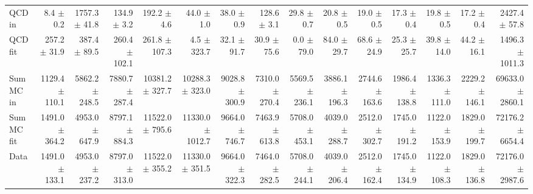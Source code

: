 \begin{table}[htbp]
{\begin{tabular}{lrrrrrrrrrrrrrr}
\hline
QCD in & 8.4 $\pm$ 0.2 & 1757.3 $\pm$ 41.8 & 134.9 $\pm$ 3.2 & 192.2 $\pm$ 4.6 & 44.0 $\pm$ 1.0 & 38.0 $\pm$ 0.9 & 128.6 $\pm$ 3.1 & 29.8 $\pm$ 0.7 & 20.8 $\pm$ 0.5 & 19.0 $\pm$ 0.5 & 17.3 $\pm$ 0.4 & 19.8 $\pm$ 0.5 & 17.2 $\pm$ 0.4 & 2427.4 $\pm$ 57.8 \\
QCD fit & 257.2 $\pm$ 31.9 & 387.4 $\pm$ 89.5 & 260.4 $\pm$ 102.1 & 261.8 $\pm$ 107.3 & 4.5 $\pm$ 323.7 & 32.1 $\pm$ 91.7 & 30.9 $\pm$ 75.6 & 0.0 $\pm$ 79.0 & 84.0 $\pm$ 29.7 & 68.6 $\pm$ 24.9 & 25.3 $\pm$ 25.7 & 39.8 $\pm$ 14.0 & 44.2 $\pm$ 16.1 & 1496.3 $\pm$ 1011.3 \\
\hline
Sum MC in & 1129.4 $\pm$ 110.1 & 5862.2 $\pm$ 248.5 & 7880.7 $\pm$ 287.4 & 10381.2 $\pm$ 327.7 & 10288.3 $\pm$ 323.0 & 9028.8 $\pm$ 300.9 & 7310.0 $\pm$ 270.4 & 5569.5 $\pm$ 236.1 & 3886.1 $\pm$ 196.3 & 2744.6 $\pm$ 163.6 & 1986.4 $\pm$ 138.8 & 1336.3 $\pm$ 111.0 & 2229.2 $\pm$ 146.1& 69633.0 $\pm$ 2860.1 \\
Sum MC fit & 1491.0 $\pm$ 364.2 & 4953.0 $\pm$ 647.9 & 8797.1 $\pm$ 884.3 & 11522.0 $\pm$ 795.6 & 11330.0 $\pm$ 1012.7 & 9664.0 $\pm$ 746.7 & 7463.9 $\pm$ 613.8 & 5708.0 $\pm$ 453.1 & 4039.0 $\pm$ 288.7 & 2512.0 $\pm$ 302.7 & 1745.0 $\pm$ 191.2 & 1122.0 $\pm$ 153.9 & 1829.0 $\pm$ 199.7 & 72176.2 $\pm$ 6654.4 \\
\hline
Data & 1491.0 $\pm$ 133.1 & 4953.0 $\pm$ 237.2 & 8797.0 $\pm$ 313.0 & 11522.0 $\pm$ 355.2 & 11330.0 $\pm$ 351.5 & 9664.0 $\pm$ 322.3 & 7464.0 $\pm$ 282.5 & 5708.0 $\pm$ 244.1 & 4039.0 $\pm$ 206.4 & 2512.0 $\pm$ 162.4 & 1745.0 $\pm$ 134.9 & 1122.0 $\pm$ 108.3 & 1829.0 $\pm$ 136.8 & 72176.0 $\pm$ 2987.6 \\
\hline
\end{tabular}
}
\end{table}

